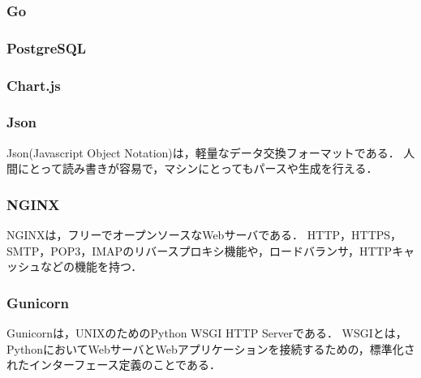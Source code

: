 \subsubsection{Go}


\subsubsection{PostgreSQL}


\subsubsection{Chart.js}


\subsubsection{Json}
Json\cite{json}(Javascript Object Notation)は，軽量なデータ交換フォーマットである．
人間にとって読み書きが容易で，マシンにとってもパースや生成を行える．

\subsubsection{NGINX}
NGINX\cite{nginx}は，フリーでオープンソースなWebサーバである．
HTTP，HTTPS，SMTP，POP3，IMAPのリバースプロキシ機能や，ロードバランサ，HTTPキャッシュなどの機能を持つ．

\subsubsection{Gunicorn}
Gunicorn\cite{gunicorn}は，UNIXのためのPython WSGI HTTP Serverである．
WSGI\cite{wsgi}とは，PythonにおいてWebサーバとWebアプリケーションを接続するための，標準化されたインターフェース定義のことである．
